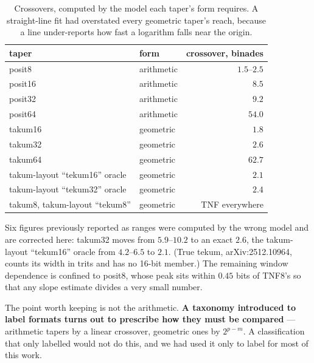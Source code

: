 \begin{table}[t]\centering
\caption{Crossovers, computed by the model each taper's form requires. A
straight-line fit had overstated every geometric taper's reach, because a line
under-reports how fast a logarithm falls near the origin.}
\label{tab:crosscorrected}
\begin{tabular}{llr}
\toprule
taper & form & crossover, binades \\
\midrule
posit8 & arithmetic & $1.5$--$2.5$ \\
posit16 & arithmetic & $8.5$ \\
posit32 & arithmetic & $9.2$ \\
posit64 & arithmetic & $54.0$ \\
takum16 & geometric & $\mathbf{1.8}$ \\
takum32 & geometric & $\mathbf{2.6}$ \\
takum64 & geometric & $\mathbf{62.7}$ \\
takum-layout ``tekum16'' oracle & geometric & $\mathbf{2.1}$ \\
takum-layout ``tekum32'' oracle & geometric & $\mathbf{2.4}$ \\
takum8, takum-layout ``tekum8'' & geometric & TNF everywhere \\
\bottomrule
\end{tabular}
\end{table}

Six figures previously reported as ranges were computed by the wrong model and
are corrected here: takum32 moves from $5.9$--$10.2$ to an exact $2.6$, the
takum-layout ``tekum16'' oracle
from $4.2$--$6.5$ to $2.1$. (True tekum, arXiv:2512.10964, counts its width in
trits and has no 16-bit member.) The remaining window dependence is confined to
posit8, whose peak sits within $0.45$ bits of TNF8's so that any slope estimate
divides a very small number.

The point worth keeping is not the arithmetic. \textbf{A taxonomy introduced to label
formats turns out to prescribe how they must be compared} --- arithmetic tapers
by a linear crossover, geometric ones by $2^{p-m}$. A classification that only
labelled would not do this, and we had used it only to label for most of this
work.



